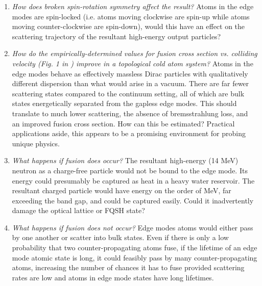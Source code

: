 \documentclass[onecolumn,
               superscriptaddress,
               floatfix,
               longbibliography, 
               showkeys,apl]{revtex4-2}
\begin{document}
\begin{enumerate}
\item \textit{How does broken spin-rotation symmetry affect the result?} Atoms in the edge modes are spin-locked (i.e. atoms moving clockwise are spin-up while atoms moving counter-clockwise are spin-down), would this have an effect on the scattering trajectory of the resultant high-energy output particles?
\item \textit{How do the empirically-determined values for fusion cross section vs. colliding velocity (Fig. 1 in \cite{MAGLICH1975IEEE}) improve in a topological cold atom system?} Atoms in the edge modes behave as effectively massless Dirac particles with qualitatively different dispersion than what would arise in a vacuum. There are far fewer scattering states compared to the continuum setting, all of which are bulk states energetically separated from the gapless edge modes. This should translate to much lower scattering, the absence of bremsstrahlung loss, and an improved fusion cross section. How can this be estimated? Practical applications aside, this appears to be a promising environment for probing unique physics.
\item \textit{What happens if fusion does occur?} The resultant high-energy (14 MeV) neutron as a charge-free particle would not be bound to the edge mode. Its energy could presumably be captured as heat in a heavy water reservoir. The resultant charged particle would have energy on the order of MeV, far exceeding the band gap, and could be captured easily. Could it inadvertently damage the optical lattice or FQSH state? 
\item \textit {What happens if fusion does not occur?} Edge modes atoms would either pass by one another or scatter into bulk states. Even if there is only a low probability that two counter-propagating atoms fuse, if the lifetime of an edge mode atomic state is long, it could feasibly pass by many counter-propagating atoms, increasing the number of chances it has to fuse provided scattering rates are low and atoms in edge mode states have long lifetimes.
\end{enumerate}




\end{document}
